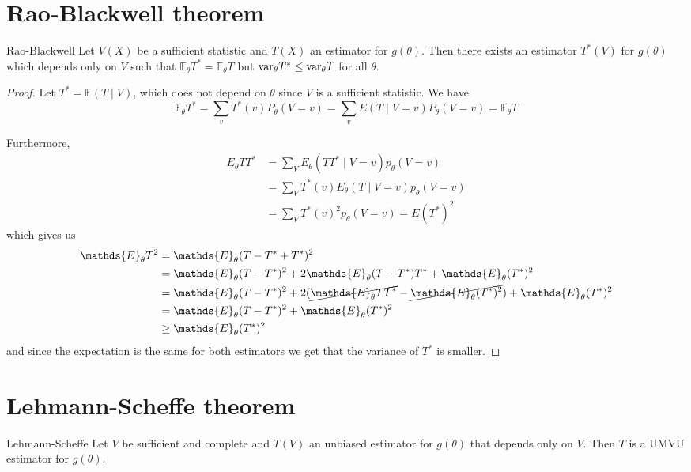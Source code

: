 \documentclass[12pt]{extarticle}
\renewcommand{\var}{{\operatorfont var}}
\newcommand{\E}{\mathds{E}}
\begin{document}
\section{Rao-Blackwell theorem}

\begin{theorem}{Rao-Blackwell}{}
	Let $V(X)$ be a sufficient statistic and $T(X)$ an estimator for $g(\theta)$.
	Then there exists an estimator $T^*(V)$ for $g(\theta)$ which depends only on $V$
	such that $\E_\theta T^* = \E_\theta T$ but $\var_\theta T^* \leq \var_\theta T$ for all $\theta$.
\end{theorem}

\begin{proof}
	Let $T^* = \E(T \mid V)$, which does not depend on $\theta$ since $V$ is a sufficient statistic.
	We have
	\begin{equation}
		\E_\theta T^* = \sum_v T^*(v) P_\theta(V = v) = \sum_v E(T\mid V = v) P_\theta(V = v) = \E_\theta T
	\end{equation}

	Furthermore,
	\begin{align}
		E_\theta T T^* & = \sum_V E_\theta(T T^* \mid V = v) p_\theta(V = v)     \\
		               & = \sum_V T^*(v) E_\theta(T \mid V = v) p_\theta (V = v) \\
		               & = \sum_V T^*(v)^2 p_\theta(V = v) = E(T^*)^2
	\end{align}
	which gives us
	\begin{align}
		\E_\theta T^2 & = \E_\theta (T - T^* + T^*)^2                                                                       \\
		              & = \E_\theta(T - T^*)^2 + 2 \E_\theta(T-T^*) T^* + \E_\theta(T^*)^2                                  \\
		              & = \E_\theta(T - T^*)^2 + 2( \cancel{\E_\theta TT^*} - \cancel{\E_\theta(T^*)^2}) + \E_\theta(T^*)^2 \\
		              & = \E_\theta(T - T^*)^2 + \E_\theta(T^*)^2                                                           \\
		              & \geq \E_\theta(T^*)^2
	\end{align}
	and since the expectation is the same for both estimators we get that the variance of $T^*$ is smaller.
\end{proof}

\section{Lehmann-Scheffe theorem}
\begin{theorem}{Lehmann-Scheffe}{}
	Let $V$ be sufficient and complete and $T(V)$ an unbiased estimator for $g(\theta)$
	that depends only on $V$.
	Then $T$ is a UMVU estimator for $g(\theta)$.
\end{theorem}
\end{document}
